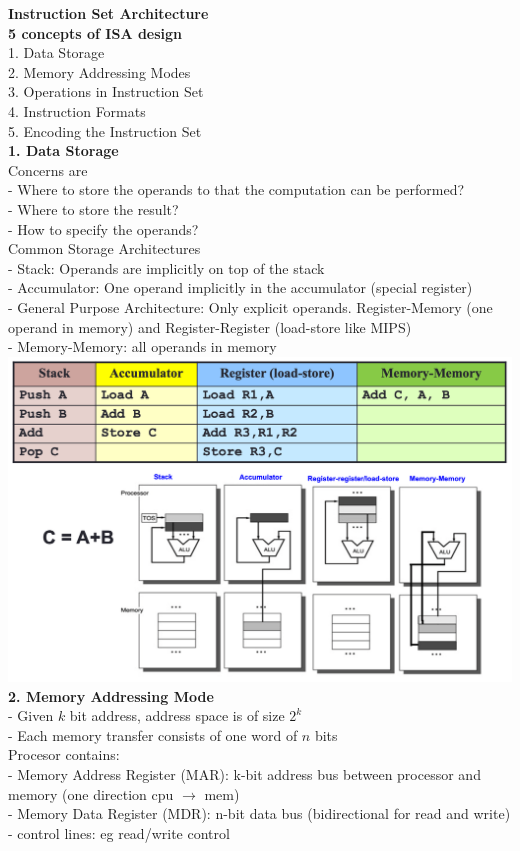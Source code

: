 \documentclass[10pt, a4paper]{article}
\begin{document}
\begin{multicols*}{3}
		{\normalsize\textbf{Instruction Set Architecture}}\\	
		\textbf{5 concepts of ISA design}\\
		1. Data Storage\\
		2. Memory Addressing Modes\\
		3. Operations in Instruction Set\\
		4. Instruction Formats\\
		5. Encoding the Instruction Set\\
		
		\textbf{1. Data Storage}\\
		Concerns are\\
		- Where to store the operands to that the computation can be performed?\\
		- Where to store the result?\\
		- How to specify the operands?\\
		
		Common Storage Architectures\\
		- Stack: Operands are implicitly on top of the stack\\
		- Accumulator: One operand implicitly in the accumulator (special register)\\
		- General Purpose Architecture: Only explicit operands. Register-Memory (one operand in memory) and Register-Register (load-store like MIPS)\\
		- Memory-Memory: all operands in memory\\
		\includegraphics[scale=.25]{./assets/dataStorage}\\
		
		\textbf{2. Memory Addressing Mode}\\
		- Given $k$ bit address, address space is of size $2^k$\\
		- Each memory transfer consists of one word of $n$ bits\\
		Procesor contains:\\
		- Memory Address Register (MAR): k-bit address bus between processor and memory (one direction cpu $\rightarrow$ mem)\\
		- Memory Data Register (MDR): n-bit data bus (bidirectional for read and write)\\
		- control lines: eg read/write control\\
		

\end{multicols*}
\end{document}
